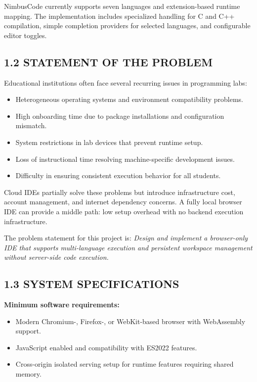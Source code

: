 NimbusCode currently supports seven languages and extension-based runtime mapping. The implementation includes specialized handling for C and C++ compilation, simple completion providers for selected languages, and configurable editor toggles.

\subsection{1.2 STATEMENT OF THE PROBLEM}
Educational institutions often face several recurring issues in programming labs:
\begin{itemize}[leftmargin=8mm]
\item Heterogeneous operating systems and environment compatibility problems.
\item High onboarding time due to package installations and configuration mismatch.
\item System restrictions in lab devices that prevent runtime setup.
\item Loss of instructional time resolving machine-specific development issues.
\item Difficulty in ensuring consistent execution behavior for all students.
\end{itemize}

Cloud IDEs partially solve these problems but introduce infrastructure cost, account management, and internet dependency concerns. A fully local browser IDE can provide a middle path: low setup overhead with no backend execution infrastructure.

The problem statement for this project is: \textit{Design and implement a browser-only IDE that supports multi-language execution and persistent workspace management without server-side code execution.}

\subsection{1.3 SYSTEM SPECIFICATIONS}
\textbf{Minimum software requirements:}
\begin{itemize}[leftmargin=8mm]
\item Modern Chromium-, Firefox-, or WebKit-based browser with WebAssembly support.
\item JavaScript enabled and compatibility with ES2022 features.
\item Cross-origin isolated serving setup for runtime features requiring shared memory.
\end{itemize}

